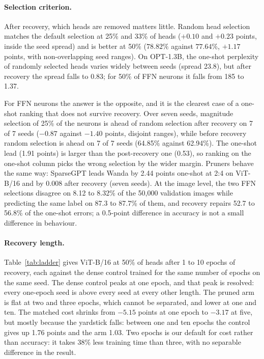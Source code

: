 \documentclass[11pt,a4paper]{article}
\begin{document}
\paragraph{Selection criterion.} After recovery, which heads are removed matters little. Random head selection matches the default selection at 25\% and 33\% of heads ($+0.10$ and $+0.23$ points, inside the seed spread) and is better at 50\% ($78.82\%$ against $77.64\%$, $+1.17$ points, with non-overlapping seed ranges). On OPT-1.3B, the one-shot perplexity of randomly selected heads varies widely between seeds (spread 23.8), but after recovery the spread falls to 0.83; for 50\% of FFN neurons it falls from 185 to 1.37.

For FFN neurons the answer is the opposite, and it is the clearest case of a one-shot ranking that does not survive recovery. Over seven seeds, magnitude selection of 25\% of the neurons is ahead of random selection after recovery on 7 of 7 seeds ($-0.87$ against $-1.40$ points, disjoint ranges), while before recovery random selection is ahead on 7 of 7 seeds (64.85\% against 62.94\%). The one-shot lead (1.91 points) is larger than the post-recovery one (0.53), so ranking on the one-shot column picks the wrong selection by the wider margin. Pruners behave the same way: SparseGPT leads Wanda by 2.44 points one-shot at 2:4 on ViT-B/16 and by 0.008 after recovery (seven seeds). At the image level, the two FFN selections disagree on 8.12 to 8.32\% of the 50{,}000 validation images while predicting the same label on 87.3 to 87.7\% of them, and recovery repairs 52.7 to 56.8\% of the one-shot errors; a 0.5-point difference in accuracy is not a small difference in behaviour.

\paragraph{Recovery length.} Table~\ref{tab:ladder} gives ViT-B/16 at 50\% of heads after 1 to 10 epochs of recovery, each against the dense control trained for the same number of epochs on the same seed. The dense control peaks at one epoch, and that peak is resolved: every one-epoch seed is above every seed at every other length. The pruned arm is flat at two and three epochs, which cannot be separated, and lower at one and ten. The matched cost shrinks from $-5.15$ points at one epoch to $-3.17$ at five, but mostly because the yardstick falls: between one and ten epochs the control gives up 1.76 points and the arm 1.03. Two epochs is our default for cost rather than accuracy: it takes 38\% less training time than three, with no separable difference in the result.
\end{document}
